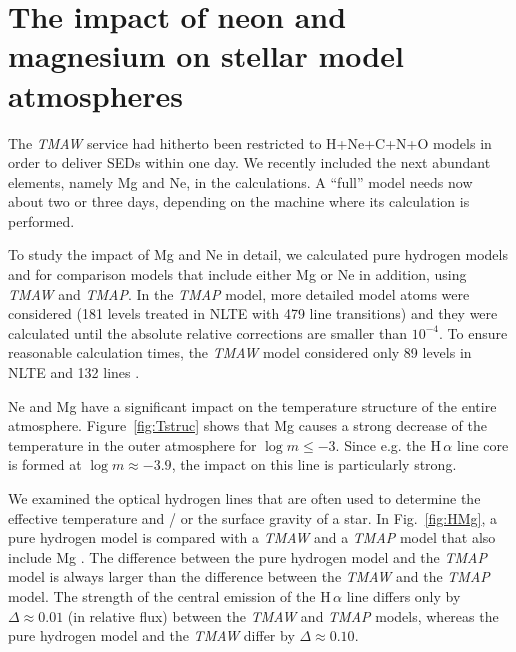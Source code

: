 \section{The impact of neon and magnesium on stellar model atmospheres}
\label{sect:nemg}

The \emph{TMAW} service had hitherto been restricted
to H+Ne+C+N+O models in order to deliver SEDs within one day.
We recently included the next abundant elements, namely Mg and Ne,
in the calculations. A ``full'' model needs now about two or three days,
depending on the machine where its calculation is performed.

To study the impact of Mg and Ne in detail, we calculated pure hydrogen models 
and for comparison models that include either Mg or Ne in addition, using 
\emph{TMAW} and \emph{TMAP}. In the \emph{TMAP} model, more detailed model atoms 
were considered (181 levels treated in NLTE with 479 line transitions)
and they were calculated until the absolute relative corrections are smaller 
than $10^{-4}$. To ensure reasonable calculation times,  the \emph{TMAW} model 
considered only 89 levels in NLTE and 132 lines \citep[cf\@.][]{rauchringat2012}.

Ne and Mg have a significant impact on the temperature structure of the entire atmosphere.
Figure~\ref{fig:Tstruc} shows that Mg causes a strong decrease of the temperature in the outer
atmosphere for $\log m \leq -3$. Since e.g\@. the H\,$\alpha$ line core is formed at 
$\log m \approx -3.9$, the impact on this line is particularly strong.

We examined the optical hydrogen lines that are often used to determine the effective 
temperature and / or the surface gravity of a star. In Fig.~\ref{fig:HMg}, a pure 
hydrogen model is compared with a \emph{TMAW} and a \emph{TMAP} model that also include 
Mg \citep[$T_\mathrm{eff}=60\,\mathrm{kK}$, $\log g = 7$, solar abundances,][]{asplundetal2009}.
The difference between the pure hydrogen model and the 
\emph{TMAP} model is always larger than the difference between the \emph{TMAW} and 
the \emph{TMAP} model. The strength of the central emission of the H\,$\alpha$ line differs 
only by $\Delta \approx 0.01$ (in relative flux) between the \emph{TMAW} and \emph{TMAP} models, 
whereas the pure hydrogen model and the \emph{TMAW} differ by $\Delta \approx 0.10$.


